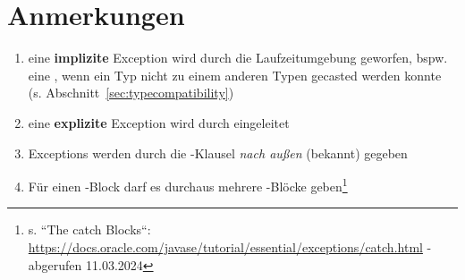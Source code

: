 \section{Anmerkungen}

\begin{enumerate}
    \item eine \textbf{implizite} Exception wird durch die Laufzeitumgebung geworfen, bspw. eine , wenn ein Typ nicht zu einem anderen Typen gecasted werden konnte (s. Abschnitt~\ref{sec:typecompatibility})
    \item eine \textbf{explizite} Exception wird durch  eingeleitet
    \item Exceptions werden durch die -Klausel \textit{nach außen} (bekannt) gegeben
    \item Für einen -Block darf es durchaus mehrere -Blöcke geben\footnote{
    s. ``The catch Blocks``: \url{https://docs.oracle.com/javase/tutorial/essential/exceptions/catch.html} - abgerufen 11.03.2024
    }
\end{enumerate}